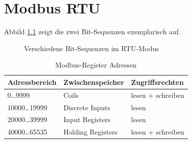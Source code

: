 \chapter{Modbus RTU}
\label{Anhang:Modbus}

Abbild \ref{fig:Bit} zeigt die zwei Bit-Sequenzen exemplarisch auf. 

\begin{figure}[htb]
\centering
{}
\caption{Verschiedene Bit-Sequenzen im RTU-Modus \citep{MODBUS.ORG2002}}
\label{fig:Bit}
\end{figure}

\begin{table}[htb]
\centering
\caption{Modbus-Register Adressen \citep{KMGH2013}}
\begin{tabular}{lll}
\hline 
\textbf{Adressbereich} & \textbf{Zwischenspeicher} & \textbf{Zugriffsrechten} \\ 
\hline 
\hline 
0\dots 9999 & Coils & lesen + schreiben \\ 
\hline 
10000\dots 19999 & Discrete Inputs & lesen \\ 
\hline 
20000\dots 39999 & Input Registers & lesen \\ 
\hline 
40000\dots 65535 & Holding Registers & lesen + schreiben \\ 
\hline 
\hline 
\end{tabular} 
\label{tab:modbus_registers}
\end{table}


